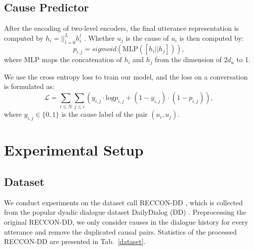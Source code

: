 \documentclass{article}
\begin{document}
\subsection{Cause Predictor}
After the encoding of two-level encoders, the final utterance representation is computed by $h_i=||_{l=0}^{L}h_{i}^{l}$ \cite{DAG}. Whether $u_j$ is the cause of $u_i$ is then computed by:
\begin{equation}
    p_{i,j}=sigmoid(\mathrm{MLP}([h_i||h_j])), 
\end{equation}
where MLP maps the concatenation of $h_i$ and $h_j$ from the dimension of ${2d_u}$ to 1. 

We use the cross entropy loss to train our model, and the loss on a conversation is formulated as:
\begin{equation}
    \mathcal{L}=\sum_{i\leq N}\sum_{j\leq i}(y_{i,j}\cdot \mathrm{log}p_{i,j}+(1-y_{i,j})\cdot(1-p_{i,j})), 
\end{equation}
where $y_{i,j}\in \{0, 1\}$ is the cause label of the pair $(u_i, u_j)$. 

\section{Experimental Setup}

\subsection{Dataset}

We conduct experiments on the dataset call RECCON-DD \cite{RECCON}, which is collected from the popular dyadic dialogue dataset DailyDialog (DD) \cite{DailyDialog}. Preprocessing the original RECCON-DD, we only consider causes in the dialogue history for every utterance and remove the duplicated causal pairs. Statistics of the processed RECCON-DD are presented in Tab.~\ref{dataset}. 
\end{document}
